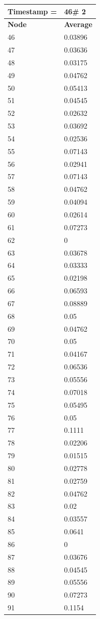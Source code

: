 \begin{tabular}{|l||l|}
\hline
\textbf{Timestamp =} & \textbf{46}\# 2\\\hline
	\textbf{Node} & \textbf{Average} \\ \hline
\hline
	46 & 0.03896 \\ \hline
	47 & 0.03636 \\ \hline
	48 & 0.03175 \\ \hline
	49 & 0.04762 \\ \hline
	50 & 0.05413 \\ \hline
	51 & 0.04545 \\ \hline
	52 & 0.02632 \\ \hline
	53 & 0.03692 \\ \hline
	54 & 0.02536 \\ \hline
	55 & 0.07143 \\ \hline
	56 & 0.02941 \\ \hline
	57 & 0.07143 \\ \hline
	58 & 0.04762 \\ \hline
	59 & 0.04094 \\ \hline
	60 & 0.02614 \\ \hline
	61 & 0.07273 \\ \hline
	62 & 0 \\ \hline
	63 & 0.03678 \\ \hline
	64 & 0.03333 \\ \hline
	65 & 0.02198 \\ \hline
	66 & 0.06593 \\ \hline
	67 & 0.08889 \\ \hline
	68 & 0.05 \\ \hline
	69 & 0.04762 \\ \hline
	70 & 0.05 \\ \hline
	71 & 0.04167 \\ \hline
	72 & 0.06536 \\ \hline
	73 & 0.05556 \\ \hline
	74 & 0.07018 \\ \hline
	75 & 0.05495 \\ \hline
	76 & 0.05 \\ \hline
	77 & 0.1111 \\ \hline
	78 & 0.02206 \\ \hline
	79 & 0.01515 \\ \hline
	80 & 0.02778 \\ \hline
	81 & 0.02759 \\ \hline
	82 & 0.04762 \\ \hline
	83 & 0.02 \\ \hline
	84 & 0.03557 \\ \hline
	85 & 0.0641 \\ \hline
	86 & 0 \\ \hline
	87 & 0.03676 \\ \hline
	88 & 0.04545 \\ \hline
	89 & 0.05556 \\ \hline
	90 & 0.07273 \\ \hline
	91 & 0.1154 \\ \hline
\end{tabular}
